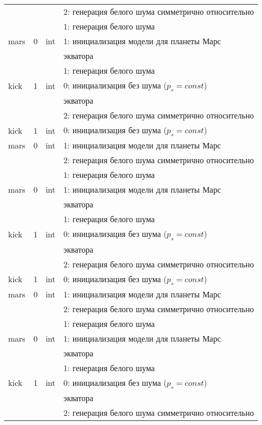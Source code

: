 \begin{longtable*}[c]{|l|c|l|l|}
&   &     & 2: генерация белого шума симметрично относительно \\
      &   &     & 1: генерация белого шума                  \\
      mars & 0 & int & 1: инициализация модели для планеты Марс     \\
  & & & экватора    \\
 &   &     & 1: генерация белого шума                  \\
kick & 1 & int & 0: инициализация без шума (\(p_s = const\)) \\
      & & & экватора    \\
      &   &     & 2: генерация белого шума симметрично относительно \\
  kick & 1 & int & 0: инициализация без шума (\(p_s = const\)) \\
 mars & 0 & int & 1: инициализация модели для планеты Марс     \\
&   &     & 2: генерация белого шума симметрично относительно \\
      &   &     & 1: генерация белого шума                  \\
      mars & 0 & int & 1: инициализация модели для планеты Марс     \\
  & & & экватора    \\
 &   &     & 1: генерация белого шума                  \\
kick & 1 & int & 0: инициализация без шума (\(p_s = const\)) \\
      & & & экватора    \\
      &   &     & 2: генерация белого шума симметрично относительно \\
  kick & 1 & int & 0: инициализация без шума (\(p_s = const\)) \\
 mars & 0 & int & 1: инициализация модели для планеты Марс     \\
&   &     & 2: генерация белого шума симметрично относительно \\
      &   &     & 1: генерация белого шума                  \\
      mars & 0 & int & 1: инициализация модели для планеты Марс     \\
  & & & экватора    \\
 &   &     & 1: генерация белого шума                  \\
kick & 1 & int & 0: инициализация без шума (\(p_s = const\)) \\
      & & & экватора    \\
      &   &     & 2: генерация белого шума симметрично относительно \\

\end{longtable*}
